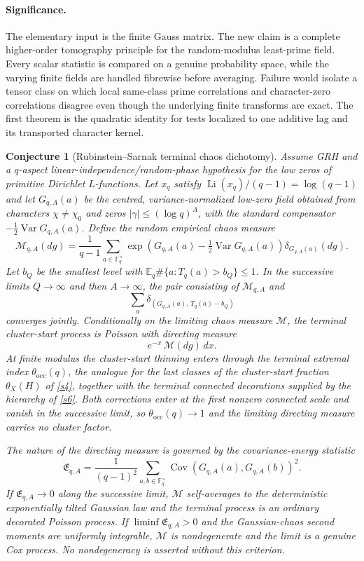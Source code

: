 \documentclass[11pt]{article}
\newtheorem{conjecture}{Conjecture}
\theoremstyle{definition}
\newcommand{\Li}{\operatorname{Li}}
\newcommand{\Var}{\operatorname{Var}}
\newcommand{\Cov}{\operatorname{Cov}}
\newcommand{\E}{\mathbb E}
\newcommand{\Fq}{\mathbb F}
\providecommand{\E}{\mathbb E}
\begin{document}
\paragraph{Significance.}
The elementary input is the finite Gauss matrix.  The new claim is a complete
higher-order tomography principle for the random-modulus least-prime field.  Every
scalar statistic is compared on a genuine probability space, while the varying finite
fields are handled fibrewise before averaging.  Failure would isolate a tensor class on
which local same-class prime correlations and character-zero correlations disagree even
though the underlying finite transforms are exact.  The first theorem is the quadratic
identity for tests localized to one additive lag and its transported character kernel.

\begin{conjecture}[Rubinstein--Sarnak terminal chaos dichotomy]\label{s8}
Assume GRH and a $q$-aspect linear-independence/random-phase hypothesis for the low zeros
of primitive Dirichlet $L$-functions.  Let $x_q$ satisfy
$\Li(x_q)/(q-1)=\log(q-1)$ and let $G_{q,A}(a)$ be the centred, variance-normalized
low-zero field obtained from characters $\chi\ne\chi_0$ and zeros
$|\gamma|\le(\log q)^A$, with the standard compensator
$-\tfrac12\Var G_{q,A}(a)$.  Define the random empirical chaos measure
\[
 \mathcal M_{q,A}(dg)=\frac1{q-1}\sum_{a\in\Fq_q^\times}
  \exp\!\left(G_{q,A}(a)-\tfrac12\Var G_{q,A}(a)\right)
  \delta_{G_{q,A}(a)}(dg).
\]
Let $b_Q$ be the smallest level with $\E_q\#\{a:T_q(a)>b_Q\}\le1$.  In the successive limits
$Q\to\infty$ and then $A\to\infty$, the pair consisting of
$\mathcal M_{q,A}$ and
\[
 \sum_a\delta_{(G_{q,A}(a),\,T_q(a)-b_Q)}
\]
converges jointly.  Conditionally on the limiting chaos measure $\mathcal M$, the
terminal cluster-start process is Poisson with directing measure
\[
 e^{-x}\,\mathcal M(dg)\,dx.
\]
At finite modulus the cluster-start thinning enters through the terminal extremal
index $\theta_{\mathrm{occ}}(q)$, the analogue for the last classes of the
cluster-start fraction $\theta_X(H)$ of \cref{s4}, together with the terminal connected decorations supplied by the hierarchy of \cref{s6}.  Both corrections enter at the first
nonzero connected scale and vanish in the successive limit, so
$\theta_{\mathrm{occ}}(q)\to1$ and the limiting directing measure carries no
cluster factor.

The nature of the directing measure is governed by the covariance-energy statistic
\[
 \mathfrak E_{q,A}=\frac1{(q-1)^2}
 \sum_{a,b\in\Fq_q^\times}
 \Cov(G_{q,A}(a),G_{q,A}(b))^2.
\]
If $\mathfrak E_{q,A}\to0$ along the successive limit, $\mathcal M$ self-averages to the
deterministic exponentially tilted Gaussian law and the terminal process is an ordinary
decorated Poisson process.  If $\liminf\mathfrak E_{q,A}>0$ and the Gaussian-chaos
second moments are uniformly integrable, $\mathcal M$ is nondegenerate and the limit is
a genuine Cox process.  No nondegeneracy is asserted without this criterion.
\end{conjecture}
\end{document}
